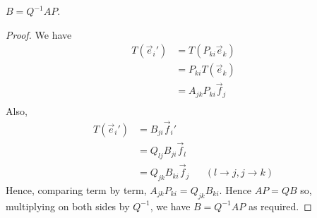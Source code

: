 \documentclass{../template/note}
\begin{document}
    \begin{proposition}
        \(B = Q^{-1}AP\).
    \end{proposition}
    
    \begin{proof}
        We have
        \begin{align*}
            T(\vec e_i') &= T(P_{ki}\vec e_k) \\
            &= P_{ki} T(\vec e_k) \\
            &= A_{jk} P_{ki} \vec f_j \\ 
        \end{align*}
        Also,
        \begin{align*}
            T(\vec e_i') &= B_{ji} \vec f_i' \\
            &= Q_{lj} B_{ji} \vec f_l \\
            &= Q_{jk} B_{ki} \vec f_j && (l \to j, j \to k)
        \end{align*}
        Hence, comparing term by term, \(A_{jk}P_{ki} = Q_{jk}B_{ki}\). Hence \(AP = QB\) so, multiplying on both sides by \(Q^{-1}\), we have \(B = Q^{-1}AP\) as required.
    \end{proof}
    
\end{document}
